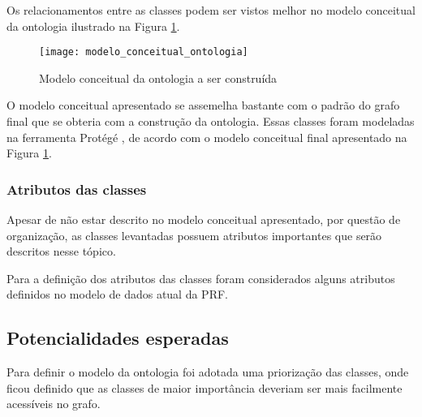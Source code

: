 	  Os relacionamentos entre as classes podem ser vistos melhor no modelo conceitual da ontologia ilustrado na
	  Figura \ref{fig:modelo_conceitual_ontologia}.\\
	  
	  \begin{figure}[!htb]
	    \centering
	    \texttt{[image: modelo\_conceitual\_ontologia]}
	    \caption[Modelo conceitual da ontologia]{Modelo conceitual da ontologia a ser construída}
	    \label{fig:modelo_conceitual_ontologia}
	  \end{figure}
	  
	  O modelo conceitual apresentado se assemelha bastante com o padrão do grafo final que se obteria com a construção da
	  ontologia.
	  Essas classes foram modeladas na ferramenta Protégé \footnotemark[2], de acordo com o modelo conceitual final
	  apresentado na Figura \ref{fig:modelo_conceitual_ontologia}.

    
	\pagebreak
	\subsubsection{Atributos das classes}
	
	    Apesar de não estar descrito no modelo conceitual apresentado, por questão de organização, as classes levantadas
	    possuem atributos importantes que serão descritos nesse tópico.
	    
	    Para a definição dos atributos das classes foram considerados alguns atributos definidos no modelo de dados atual da PRF.\\
	    
	    
      
      \pagebreak
      \subsection{Potencialidades esperadas}
	  
	  Para definir o modelo da ontologia foi adotada uma priorização das classes, onde ficou definido que as classes
	  de maior importância deveriam ser mais facilmente acessíveis no grafo.